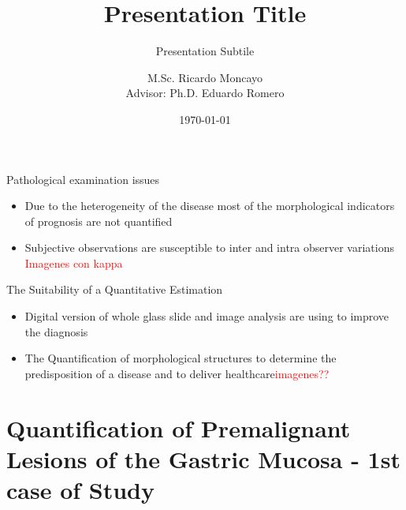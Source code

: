 \documentclass[usenames,dvipsnames]{beamer}
\author{M.Sc. Ricardo Moncayo\\Advisor: Ph.D. Eduardo Romero}
\title{Presentation Title}
\subtitle{Presentation Subtile}
\institute{Departamento Ingeniería \\ Eléctrica}
\date{\today}
\begin{document}
\begin{frame}[plain]
\maketitle
\small
{\centering\itshape \par}
\par\medskip

\end{frame}


\begin{frame}{Pathological examination issues}
	\begin{itemize}
	 \item Due to the heterogeneity of the disease most of the morphological indicators of prognosis are not quantified
     \pause
	 \item Subjective observations are susceptible to inter and intra observer variations
      \textcolor{red}{Imagenes con kappa}	 
	 
	\end{itemize}
\end{frame}

\begin{frame}{The Suitability of a Quantitative Estimation}
 \begin{itemize}
  \item Digital version of whole glass slide and image analysis are using to improve the diagnosis
  \pause

  \item The Quantification of morphological structures to determine the predisposition of a disease and to deliver healthcare\textcolor{red}{imagenes??}
  
  
  
 \end{itemize}
\end{frame}

\section{Quantification of Premalignant Lesions of the Gastric Mucosa - 1st case of Study}
\end{document}
